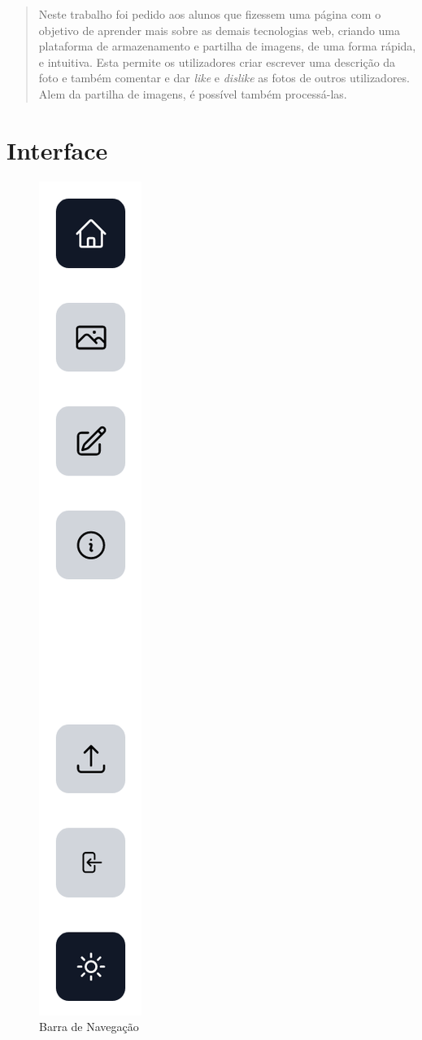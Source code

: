 \documentclass{report}
\begin{document}
\clearpage
{}

\renewcommand{\abstractname}{Objetivos do projeto}
\begin{abstract}

Neste trabalho foi pedido aos alunos que fizessem uma página com o objetivo de aprender mais sobre as demais tecnologias web, criando uma plataforma de armazenamento e partilha de imagens, de uma forma rápida, e intuitiva. Esta permite os utilizadores criar escrever uma descrição da foto e também comentar e dar \textit{like} e \textit{dislike} as fotos de outros utilizadores. Alem da partilha de imagens, é possível também processá-las.

\end{abstract}

\chapter{Interface}

\label{chap.interface}
\begin{figure} %
  \centering
  \includegraphics[width=0.2\linewidth]{navbar.png}
  \caption{Barra de Navegação}
\end{figure}
\end{document}
